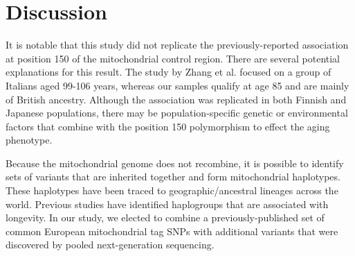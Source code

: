 \section{Discussion}
It is notable that this study did not replicate the previously-reported association at position 150 of the mitochondrial control region\cite{zhang2003strikingly}. There are several potential explanations for this result. The study by Zhang et al. focused on a group of Italians aged 99-106 years, whereas our samples qualify at age 85 and are mainly of British ancestry. Although the association was replicated in both Finnish and Japanese populations,\cite{niemi2005combination} there may be population-specific genetic or environmental factors that combine with the position 150 polymorphism to effect the aging phenotype.

Because the mitochondrial genome does not recombine, it is possible to identify sets of variants that are inherited together and form mitochondrial haplotypes.  These haplotypes have been traced to geographic/ancestral lineages across the world\cite{behar2007genographic}.  Previous studies have identified haplogroups that are associated with longevity\cite{dato2004association,Costa2009,de1999mitochondrial}.  In our study, we elected to combine a previously-published set of common European mitochondrial tag SNPs\cite{saxena2006comprehensive} with additional variants that were discovered by pooled next-generation sequencing.
\newpage
